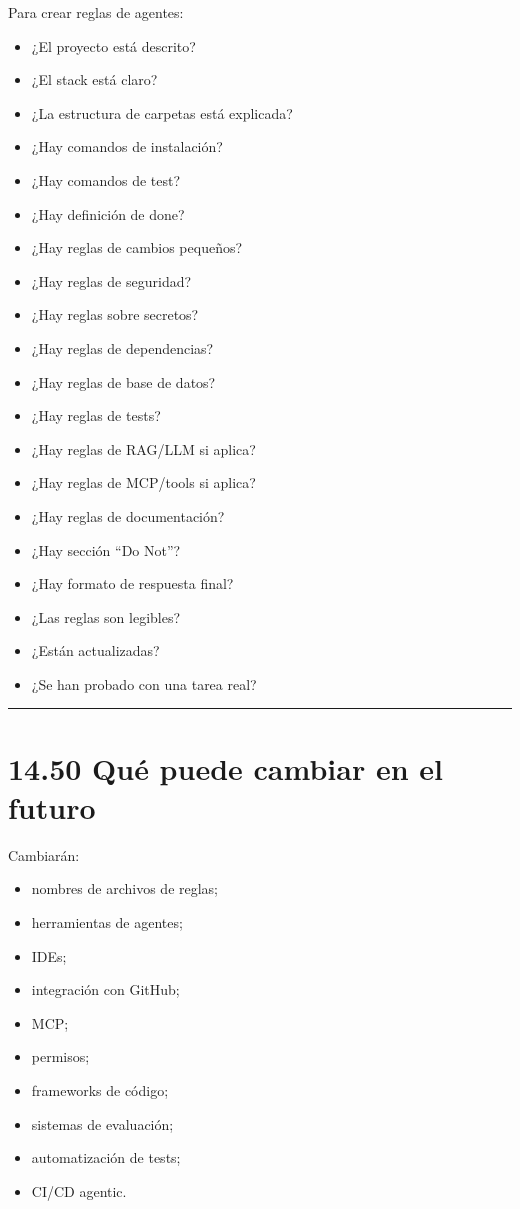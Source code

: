 Para crear reglas de agentes:

\begin{itemize}
\tightlist
\item
  ¿El proyecto está descrito?
\item
  ¿El stack está claro?
\item
  ¿La estructura de carpetas está explicada?
\item
  ¿Hay comandos de instalación?
\item
  ¿Hay comandos de test?
\item
  ¿Hay definición de done?
\item
  ¿Hay reglas de cambios pequeños?
\item
  ¿Hay reglas de seguridad?
\item
  ¿Hay reglas sobre secretos?
\item
  ¿Hay reglas de dependencias?
\item
  ¿Hay reglas de base de datos?
\item
  ¿Hay reglas de tests?
\item
  ¿Hay reglas de RAG/LLM si aplica?
\item
  ¿Hay reglas de MCP/tools si aplica?
\item
  ¿Hay reglas de documentación?
\item
  ¿Hay sección ``Do Not''?
\item
  ¿Hay formato de respuesta final?
\item
  ¿Las reglas son legibles?
\item
  ¿Están actualizadas?
\item
  ¿Se han probado con una tarea real?
\end{itemize}

\begin{center}\rule{0.5\linewidth}{0.5pt}\end{center}

\section{14.50 Qué puede cambiar en el
futuro}\label{quuxe9-puede-cambiar-en-el-futuro-13}

Cambiarán:

\begin{itemize}
\tightlist
\item
  nombres de archivos de reglas;
\item
  herramientas de agentes;
\item
  IDEs;
\item
  integración con GitHub;
\item
  MCP;
\item
  permisos;
\item
  frameworks de código;
\item
  sistemas de evaluación;
\item
  automatización de tests;
\item
  CI/CD agentic.
\end{itemize}

